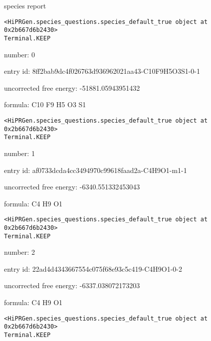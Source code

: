 \documentclass{article}
\begin{document}
\setlength\parindent{0pt}


species report

\begin{verbatim}
<HiPRGen.species_questions.species_default_true object at 0x2b667d6b2430>
Terminal.KEEP
\end{verbatim}


number: 0



entry id: 8ff2bab9dc4f026763d936962021aa43-C10F9H5O3S1-0-1



uncorrected free energy: -51881.05943951432



formula: C10 F9 H5 O3 S1


\vspace{1cm}
\begin{verbatim}
<HiPRGen.species_questions.species_default_true object at 0x2b667d6b2430>
Terminal.KEEP
\end{verbatim}


number: 1



entry id: af0733dcda4cc3494970c99618faad2a-C4H9O1-m1-1



uncorrected free energy: -6340.551332453043



formula: C4 H9 O1


\vspace{1cm}
\begin{verbatim}
<HiPRGen.species_questions.species_default_true object at 0x2b667d6b2430>
Terminal.KEEP
\end{verbatim}


number: 2



entry id: 22ad4d4343667554c075f68e93c5c419-C4H9O1-0-2



uncorrected free energy: -6337.038072173203



formula: C4 H9 O1


\vspace{1cm}
\begin{verbatim}
<HiPRGen.species_questions.species_default_true object at 0x2b667d6b2430>
Terminal.KEEP
\end{verbatim}
\end{document}
